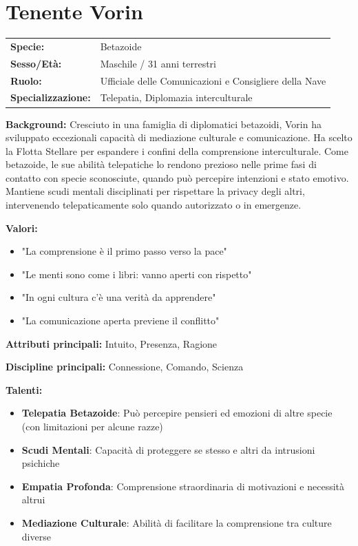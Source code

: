 \documentclass[11pt,a4paper]{article}
\begin{document}
\section{Tenente Vorin}

\begin{tcolorbox}[colback=fedlightblue!10, colframe=fedblue]
\begin{tabularx}{\textwidth}{lX}
\textbf{Specie:} & Betazoide \\
\textbf{Sesso/Età:} & Maschile / 31 anni terrestri \\
\textbf{Ruolo:} & Ufficiale delle Comunicazioni e Consigliere della Nave \\
\textbf{Specializzazione:} & Telepatia, Diplomazia interculturale \\
\end{tabularx}

\textbf{Background:} Cresciuto in una famiglia di diplomatici betazoidi, Vorin ha sviluppato eccezionali capacità di mediazione culturale e comunicazione. Ha scelto la Flotta Stellare per espandere i confini della comprensione interculturale. Come betazoide, le sue abilità telepatiche lo rendono prezioso nelle prime fasi di contatto con specie sconosciute, quando può percepire intenzioni e stato emotivo. Mantiene scudi mentali disciplinati per rispettare la privacy degli altri, intervenendo telepaticamente solo quando autorizzato o in emergenze.

\textbf{Valori:}
\begin{itemize}[leftmargin=*]
\item "La comprensione è il primo passo verso la pace"
\item "Le menti sono come i libri: vanno aperti con rispetto"
\item "In ogni cultura c'è una verità da apprendere"
\item "La comunicazione aperta previene il conflitto"
\end{itemize}

\textbf{Attributi principali:} Intuito, Presenza, Ragione

\textbf{Discipline principali:} Connessione, Comando, Scienza

\textbf{Talenti:}
\begin{itemize}[leftmargin=*]
\item \textbf{Telepatia Betazoide}: Può percepire pensieri ed emozioni di altre specie (con limitazioni per alcune razze)
\item \textbf{Scudi Mentali}: Capacità di proteggere se stesso e altri da intrusioni psichiche
\item \textbf{Empatia Profonda}: Comprensione straordinaria di motivazioni e necessità altrui
\item \textbf{Mediazione Culturale}: Abilità di facilitare la comprensione tra culture diverse
\end{itemize}
\end{tcolorbox}
\end{document}
